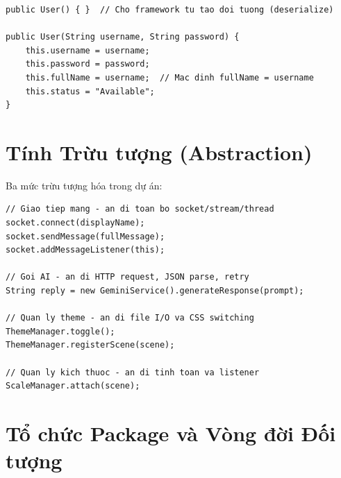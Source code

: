 \documentclass[12pt, a4paper, oneside]{report}
\begin{document}
\begin{lstlisting}[caption={Nạp chồng constructor phục vụ ngữ cảnh khác nhau},
                   label=lst:overload, style=javastyle]
public User() { }  // Cho framework tu tao doi tuong (deserialize)

public User(String username, String password) {
    this.username = username;
    this.password = password;
    this.fullName = username;  // Mac dinh fullName = username
    this.status = "Available";
}
\end{lstlisting}

\section{Tính Trừu tượng (Abstraction)}

Ba mức trừu tượng hóa trong dự án:

\begin{tcolorbox}[infostyle, title={API trừu tượng tối giản cho các Controller}]
\begin{lstlisting}[style=javastyle, numbers=none]
// Giao tiep mang - an di toan bo socket/stream/thread
socket.connect(displayName);
socket.sendMessage(fullMessage);
socket.addMessageListener(this);

// Goi AI - an di HTTP request, JSON parse, retry
String reply = new GeminiService().generateResponse(prompt);

// Quan ly theme - an di file I/O va CSS switching
ThemeManager.toggle();
ThemeManager.registerScene(scene);

// Quan ly kich thuoc - an di tinh toan va listener
ScaleManager.attach(scene);
\end{lstlisting}
\end{tcolorbox}

\section{Tổ chức Package và Vòng đời Đối tượng}
\end{document}
